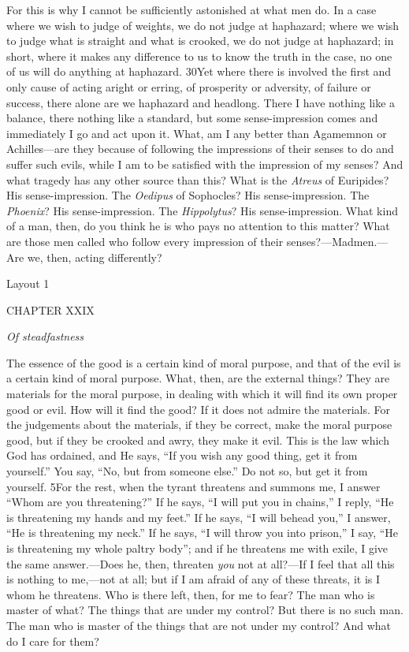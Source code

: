 For this is why I cannot be sufficiently astonished at what men do. In a case where we wish to judge of weights, we do not judge at haphazard; where we wish to judge what is straight and what is crooked, we do not judge at haphazard; in short, where it makes any difference to us to know the truth in the case, no one of us will do anything at haphazard. 30Yet where there is involved the first and only cause of acting aright or erring, of prosperity or adversity, of failure or success, there alone are we haphazard and headlong. There I have nothing like a balance, there nothing like a standard, but some sense-impression comes and immediately I go and act upon it. What, am I any better than Agamemnon or Achilles—are they because of following the impressions of their senses to do and suffer such evils, while I am to be satisfied with the impression of my senses? And what tragedy has any other source than this? What is the \emph{Atreus} of Euripides? His sense-impression. The \emph{Oedipus} of Sophocles? His sense-impression. The \emph{Phoenix}? His sense-impression. The \emph{Hippolytus}? His sense-impression. What kind of a man, then, do you think he is who pays no attention to this matter? What are those men called who follow every impression of their senses?—Madmen.—Are we, then, acting differently?



Layout 1

CHAPTER XXIX

\emph{Of steadfastness}

The essence of the good is a certain kind of moral purpose, and that of the evil is a certain kind of moral purpose. What, then, are the external things? They are materials for the moral purpose, in dealing with which it will find its own proper good or evil. How will it find the good? If it does not admire the materials. For the judgements about the materials, if they be correct, make the moral purpose good, but if they be crooked and awry, they make it evil. This is the law which God has ordained, and He says, ``If you wish any good thing, get it from yourself.'' You say, ``No, but from someone else.'' Do not so, but get it from yourself. 5For the rest, when the tyrant threatens and summons me, I answer ``Whom are you threatening?'' If he says, ``I will put you in chains,'' I reply, ``He is threatening my hands and my feet.'' If he says, ``I will behead you,'' I answer, ``He is threatening my neck.'' If he says, ``I will throw you into prison,'' I say, ``He is threatening my whole paltry body''; and if he threatens me with exile, I give the same answer.—Does he, then, threaten \emph{you} not at all?—If I feel that all this is nothing to me,—not at all; but if I am afraid of any of these threats, it is I whom he threatens. Who is there left, then, for me to fear? The man who is master of what? The things that are under my control? But there is no such man. The man who is master of the things that are not under my control? And what do I care for them?

